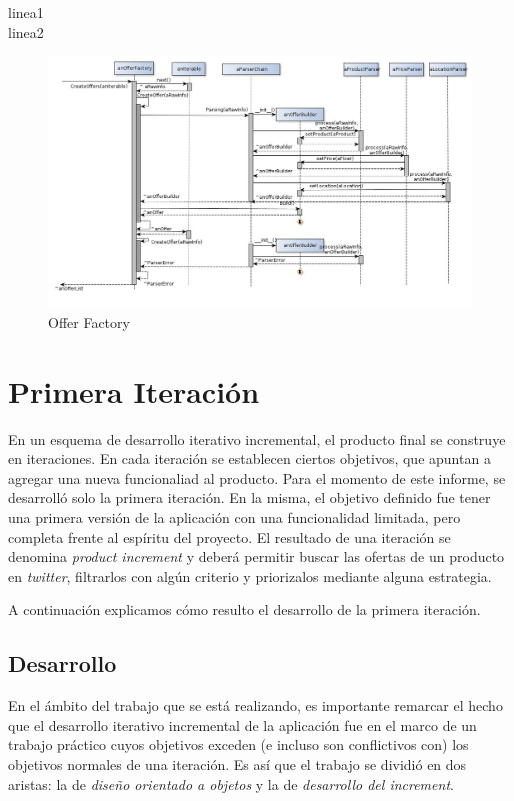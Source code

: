 \documentclass[10pt, a4paper]{article}
\begin{document}
\begin{landscape}
\newpage
linea1\\
linea2\\
\begin{figure}[H]
\centering
\includegraphics[scale=0.60]{graphics/OfferFactory_sequence.jpg}
\caption{Offer Factory}
\end{figure}

\end{landscape}

\section{Primera Iteración}

En un esquema de desarrollo iterativo incremental, el producto final se construye en iteraciones. En cada iteración se establecen ciertos objetivos, que apuntan a agregar una nueva funcionaliad al producto. Para el momento de este informe, se desarrolló solo la primera iteración. En la misma, el objetivo definido fue tener una primera versión de la aplicación con una funcionalidad limitada, pero completa frente al espíritu del proyecto. El resultado de una iteración se denomina \emph{product increment} y deberá permitir buscar las ofertas de un producto en \emph{twitter}, filtrarlos con algún criterio y priorizalos mediante alguna estrategia.

A continuación explicamos cómo resulto el desarrollo de la primera iteración.

\subsection{Desarrollo}

En el ámbito del trabajo que se está realizando, es importante remarcar el hecho que el desarrollo iterativo incremental de la aplicación fue en el marco de un trabajo práctico cuyos objetivos exceden (e incluso son conflictivos con) los objetivos normales de una iteración. Es así que el trabajo se dividió en dos aristas: la de \emph{diseño orientado a objetos} y la de \emph{desarrollo del increment}. 
\end{document}
